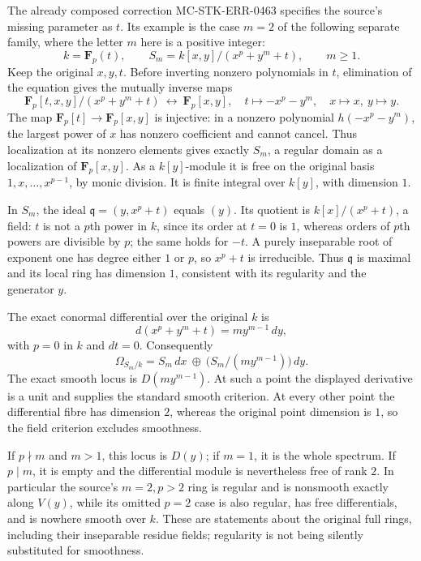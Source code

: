 The already composed correction MC-STK-ERR-0463 specifies the source's missing parameter as \(t\). Its example is the case \(m=2\) of the following separate family, where the letter \(m\) here is a positive integer: \[
k=\mathbf F_p(t),\qquad
S_m=k[x,y]/(x^p+y^m+t),\qquad m\ge1.
\] Keep the original \(x,y,t\). Before inverting nonzero polynomials in \(t\), elimination of the equation gives the mutually inverse maps \[
\mathbf F_p[t,x,y]/(x^p+y^m+t)\ \longleftrightarrow\ \mathbf F_p[x,y],
\quad t\longmapsto-x^p-y^m,\quad x\longmapsto x,\ y\longmapsto y.
\] The map \(\mathbf F_p[t]\to\mathbf F_p[x,y]\) is injective: in a nonzero polynomial \(h(-x^p-y^m)\), the largest power of \(x\) has nonzero coefficient and cannot cancel. Thus localization at its nonzero elements gives exactly \(S_m\), a regular domain as a localization of \(\mathbf F_p[x,y]\). As a \(k[y]\)-module it is free on the original basis \(1,x,\ldots,x^{p-1}\), by monic division. It is finite integral over \(k[y]\), with dimension \(1\).

In \(S_m\), the ideal \(\mathfrak q=(y,x^p+t)\) equals \((y)\). Its quotient is \(k[x]/(x^p+t)\), a field: \(t\) is not a \(p\)th power in \(k\), since its order at \(t=0\) is \(1\), whereas orders of \(p\)th powers are divisible by \(p\); the same holds for \(-t\). A purely inseparable root of exponent one has degree either \(1\) or \(p\), so \(x^p+t\) is irreducible. Thus \(\mathfrak q\) is maximal and its local ring has dimension \(1\), consistent with its regularity and the generator \(y\).

The exact conormal differential over the original \(k\) is \[
d(x^p+y^m+t)=m y^{m-1}\,dy,
\] with \(p=0\) in \(k\) and \(dt=0\). Consequently \[
\Omega_{S_m/k}=S_m\,dx\ \oplus\
\bigl(S_m/(m y^{m-1})\bigr)\,dy.
\] The exact smooth locus is \(D(m y^{m-1})\). At such a point the displayed derivative is a unit and supplies the standard smooth criterion. At every other point the differential fibre has dimension \(2\), whereas the original point dimension is \(1\), so the field criterion excludes smoothness.

If \(p\nmid m\) and \(m>1\), this locus is \(D(y)\); if \(m=1\), it is the whole spectrum. If \(p\mid m\), it is empty and the differential module is nevertheless free of rank \(2\). In particular the source's \(m=2,p>2\) ring is regular and is nonsmooth exactly along \(V(y)\), while its omitted \(p=2\) case is also regular, has free differentials, and is nowhere smooth over \(k\). These are statements about the original full rings, including their inseparable residue fields; regularity is not being silently substituted for smoothness.

